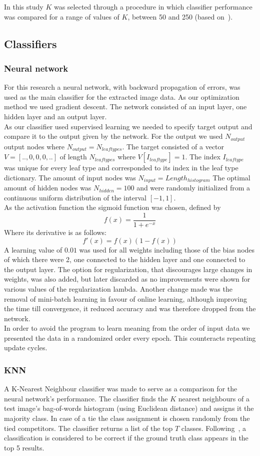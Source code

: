 In this study $K$ was selected through a procedure in which classifier performance was compared for a range of values of $K$, between 50 and 250 (based on~\cite{Nguy2013}).



\subsection{Classifiers}

\subsubsection{Neural network}
For this research a neural network, with backward propagation of errors, was used as the main classifier for the extracted image data. As our optimization method we used gradient descent. The network consisted of an input layer, one hidden layer and an output layer.\\
As our classifier used supervised learning we needed to specify target output and compare it to the output given by the network. For the output we used $N_{output}$ output nodes where $N_{output}=N_{leaftypes}$. The target consisted of a vector $V=[..,0,0,0,..]$ of length $N_{leaftypes}$ where $V[I_{leaftype}]=1$. The index $I_{leaftype}$ was unique for every leaf type and corresponded to its index in the leaf type dictionary. The amount of input nodes was $N_{input}=Length_{histogram}$ The optimal amount of hidden nodes was $N_{hidden}=100$ and were randomly initialized from a continuous uniform distribution of the interval $[-1, 1]$.\\
As the activation function the sigmoid function was chosen, defined by $$f(x)=\frac{1}{1+e^{-x}}$$
Where its derivative is as follows:
$$f'(x)=f(x)(1-f(x))$$
A learning value of $0.01$ was used for all weights including those of the bias nodes of which there were 2, one connected to the hidden layer and one connected to the output layer. The option for regularization, that discourages large changes in weights, was also added, but later discarded as no improvements were shown for various values of the regularization lambda. Another change made was the removal of mini-batch learning in favour of online learning, although improving the time till convergence, it reduced accuracy and was therefore dropped from the network.\\
In order to avoid the program to learn meaning from the order of input data we presented the data in a randomized order every epoch. This counteracts repeating update cycles.

\subsubsection{KNN}
A K-Nearest Neighbour classifier was made to serve as a comparison for the neural network's performance.
The classifier finds the $K$ nearest neighbours of a test image's bag-of-words histogram (using Euclidean distance) and assigns it the majority class.
In case of a tie the class assignment is chosen randomly from the tied competitors.
The classifier returns a list of the top $T$ classes.
Following~\cite{Wang2011, Belh2008}, a classification is considered to be correct if the ground truth class appears in the top 5 results. 
